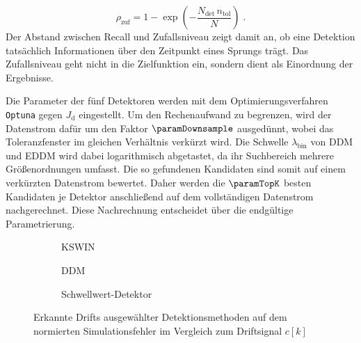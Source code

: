 %
\begin{equation}
    \rho_{\mathrm{zuf}} = 1 - \exp\!\left(- \frac{N_{\mathrm{det}} \, n_{\mathrm{tol}}}{N}\right) \; .
    \label{eq:detektion_zufallsniveau}
\end{equation}
%
Der Abstand zwischen Recall und Zufallsniveau zeigt damit an, ob eine Detektion tatsächlich Informationen über den Zeitpunkt eines Sprungs trägt. Das Zufallsniveau geht nicht in die Zielfunktion ein, sondern dient als Einordnung der Ergebnisse. \par
%
Die Parameter der fünf Detektoren werden mit dem Optimierungsverfahren \texttt{Optuna} gegen $J_{\mathrm{d}}$ eingestellt. Um den Rechenaufwand zu begrenzen, wird der Datenstrom dafür um den Faktor $\paramDownsample$ ausgedünnt, wobei das Toleranzfenster im gleichen Verhältnis verkürzt wird. 
Die Schwelle $\lambda_{\mathrm{bin}}$ von \ac{DDM} und \ac{EDDM} wird dabei logarithmisch abgetastet, da ihr Suchbereich mehrere Größenordnungen umfasst. Die so gefundenen Kandidaten sind somit auf einem verkürzten Datenstrom bewertet. Daher werden die $\paramTopK$ besten Kandidaten je Detektor anschließend auf dem vollständigen Datenstrom nachgerechnet. Diese Nachrechnung entscheidet über die endgültige Parametrierung. \par
%
\begin{figure}[tbp]
    \centering
    \begin{subfigure}[t]{\textwidth}
        \centering
        
        \caption{\ac{KSWIN}}
        \label{fig:synthetic_data_detection_kswin}
    \end{subfigure}

    \begin{subfigure}[t]{\textwidth}
        \centering
        
        \caption{\ac{DDM}}
        \label{fig:synthetic_data_detection_ddm}
    \end{subfigure}

    \begin{subfigure}[t]{\textwidth}
        \centering
        
        \caption{Schwellwert-Detektor}
        \label{fig:synthetic_data_detection_rmse}
    \end{subfigure}
    \caption{Erkannte Drifts ausgewählter Detektionsmethoden auf dem normierten Simulationsfehler im Vergleich zum Driftsignal $c[k]$}
    \label{fig:synthetic_data_detection_comparison}
\end{figure}
%

